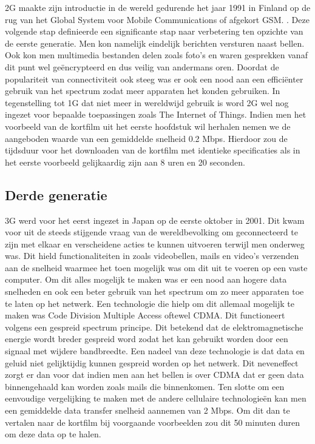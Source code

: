2G maakte zijn introductie in de wereld gedurende het jaar 1991 in Finland op de rug van het Global System voor Mobile Communications of afgekort GSM. \autocite{Galazzo2020}. Deze volgende stap definieerde een significante stap naar verbetering ten opzichte van de eerste generatie. Men kon namelijk eindelijk berichten versturen naast bellen. Ook kon men multimedia bestanden delen zoals foto's en waren gesprekken vanaf dit punt wel geëncrypteerd en dus veilig van andermans oren. Doordat de populariteit van connectiviteit ook steeg was er ook een nood aan een efficiënter gebruik van het spectrum zodat meer apparaten het konden gebruiken. In tegenstelling tot 1G dat niet meer in wereldwijd gebruik is word 2G wel nog ingezet voor bepaalde toepassingen zoals The Internet of Things. \autocite{Henke2021} Indien men het voorbeeld van de kortfilm uit het eerste hoofdstuk wil herhalen nemen we de aangeboden waarde van een gemiddelde snelheid 0.2 Mbps. \autocite{Galazzo2020} Hierdoor zou de tijdsduur voor het downloaden van de kortfilm met identieke specificaties als in het eerste voorbeeld gelijkaardig zijn aan 8 uren en 20 seconden. \autocite{Wooding2024}

\subsection{Derde generatie}

3G werd voor het eerst ingezet in Japan op de eerste oktober in 2001. Dit kwam voor uit de steeds stijgende vraag van de wereldbevolking om geconnecteerd te zijn met elkaar en verscheidene acties te kunnen uitvoeren terwijl men onderweg was. Dit hield functionaliteiten in zoals videobellen, mails en video's verzenden aan de snelheid waarmee het toen mogelijk was om dit uit te voeren op een vaste computer. Om dit alles mogelijk te maken was er een nood aan hogere data snelheden en ook een beter gebruik van het spectrum om zo meer apparaten toe te laten op het netwerk. \autocite{Dulcey2020} Een technologie die hielp om dit allemaal mogelijk te maken was Code Division Multiple Access oftewel CDMA. Dit functioneert volgens een gespreid spectrum principe. Dit betekend dat de elektromagnetische energie wordt breder gespreid word zodat het kan gebruikt worden door een signaal met wijdere bandbreedte. Een nadeel van deze technologie is dat data en geluid niet gelijktijdig kunnen gespreid worden op het netwerk. Dit neveneffect zorgt er dan voor dat indien men aan het bellen is over CDMA dat er geen data binnengehaald kan worden zoals mails die binnenkomen. \autocite{Fendelman2021} Ten slotte om een eenvoudige vergelijking te maken met de andere cellulaire technologieën kan men een gemiddelde data transfer snelheid aannemen van 2 Mbps.\autocite{Galazzo2020} Om dit dan te vertalen naar de kortfilm bij voorgaande voorbeelden zou dit 50 minuten duren om deze data op te halen. \autocite{Wooding2024}

